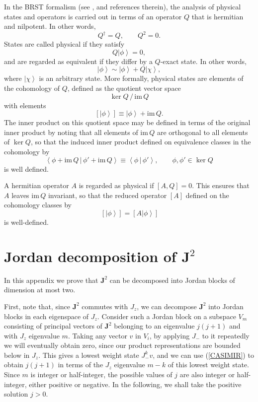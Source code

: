 \documentclass[a4paper,dvips,12pt]{article}
\newcommand {\ket}[1] {\left| #1 \right>}
\newcommand {\braket}[2] {\left< { \left. #1 \,\right|} \,#2 \right>}
\newcommand {\im} {\mathrm{im}\,}
\begin{document}
    In the BRST formalism (see \cite{BRST}, \cite{HENNEAUX} and references therein),
    the analysis of physical states and
    operators is carried out in terms of an operator $Q$ that is hermitian
    and nilpotent.  In other words,
    \[
        Q^\dagger = Q, \qquad Q^2 = 0.
    \]
    States are called physical if they satisfy
    \[
        Q\ket{\phi} = 0,
    \]
    and are regarded as equivalent if they differ by a $Q$-exact
    state. In other words,
    \[
        \ket{\phi} \sim \ket{\phi} + Q \ket{\chi},
    \]
    where $\ket{\chi}$ is an arbitrary state.
    More formally, physical states are elements of the
    cohomology of $Q$, defined as the quotient vector space
    \[
        {\ker Q\, / \,\im Q}
    \]
    with elements
    \[
        [\ket{\phi}] \equiv \ket{\phi} + \im Q.
    \]
    The inner product on this quotient space may be defined in
    terms of the original inner product by
    noting that all elements of $\im Q$ are orthogonal to all
    elements of $\ker Q$, so that the induced inner product
    defined on equivalence classes in the cohomology by
    \[
        \braket {\phi + \im Q}{\phi' + \im Q} \equiv
        \braket{\phi}{\phi'}, \qquad \phi, \phi' \in \ker Q
    \]
    is well defined.

    A hermitian operator $A$ is regarded as physical if $[A, Q] =
    0$.  This ensures that $A$ leaves $\im Q$ invariant, so that
    the reduced operator $[A]$ defined on the cohomology classes by
    \begin{equation}
        [A]\,[\ket{\phi}] = [A\ket{\phi}]   \label{AREDUCED}
    \end{equation}
    is well-defined.

    \section{Jordan decomposition of $\mathbf{J}^2$}
    \label{J2ANALYSIS}

    In this appendix we prove that $\mathbf{J}^2$ can be decomposed
    into Jordan blocks of dimension at most two.

    First, note that, since $\mathbf{J}^2$ commutes with $J_z$,
    we can decompose $\mathbf{J}^2$ into Jordan blocks in each
    eigenspace of $J_z$.  Consider such a Jordan block on a subspace
    $V_m$ consisting of
    principal vectors of $\mathbf{J}^2$ belonging to an eigenvalue
    $j(j+1)$ and with
    $J_z$ eigenvalue $m$.  Taking any vector $v$ in $V_i$,
    by applying $J_-$ to it repeatedly we will eventually obtain
    zero, since our product representations are bounded below in
    $J_z$.  This gives a lowest weight state $J_-^k v$, and we can
    use (\ref{CASIMIR}) to obtain $j(j+1)$ in terms of the $J_z$ eigenvalue
    $m - k$ of this
    lowest weight state.  Since $m$ is integer or half-integer,
    the possible values of $j$ are also integer or
    half-integer, either positive or negative.  In the following,
    we shall take the positive solution $j>0$.
\end{document}
